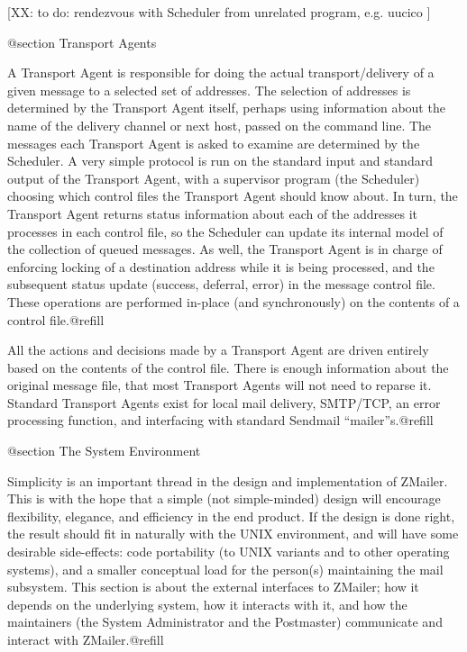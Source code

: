 [XX: to do: rendezvous with Scheduler from unrelated program, e.g. uucico ]

@section Transport Agents

A Transport Agent is responsible for doing the actual transport/delivery of
a given message to a selected set of addresses. The selection of addresses
is determined by the Transport Agent itself, perhaps using information about
the name of the delivery channel or next host, passed on the command line.
The messages each Transport Agent is asked to examine are determined by the
Scheduler. A very simple protocol is run on the standard input and standard
output of the Transport Agent, with a supervisor program (the Scheduler)
choosing which control files the Transport Agent should know about. In turn,
the Transport Agent returns status information about each of the addresses
it processes in each control file, so the Scheduler can update its internal
model of the collection of queued messages. As well, the Transport Agent is
in charge of enforcing locking of a destination address while it is being
processed, and the subsequent status update (success, deferral, error) in
the message control file. These operations are performed in-place (and
synchronously) on the contents of a control file.@refill

All the actions and decisions made by a Transport Agent are driven entirely
based on the contents of the control file. There is enough information about
the original message file, that most Transport Agents will not need to
reparse it. Standard Transport Agents exist for local mail delivery, SMTP/TCP,
an error processing function, and interfacing with standard Sendmail
``mailer''s.@refill

@section The System Environment

Simplicity is an important thread in the design and implementation of
ZMailer.  This is with the hope that a simple (not simple-minded)
design will encourage flexibility, elegance, and efficiency in the end
product.  If the design is done right, the result should fit in
naturally with the UNIX environment, and will have some desirable
side-effects: code portability (to UNIX variants and to other operating
systems), and a smaller conceptual load for the person(s) maintaining
the mail subsystem.  This section is about the external interfaces to
ZMailer; how it depends on the underlying system, how it interacts with
it, and how the maintainers (the System Administrator and the
Postmaster) communicate and interact with ZMailer.@refill

